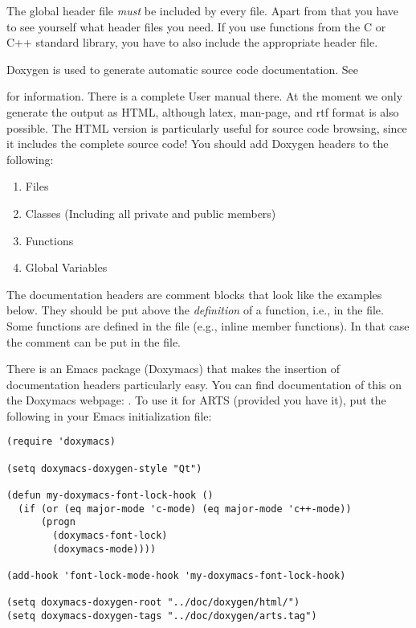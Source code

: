 The global header file  \emph{must} be included by every
file. Apart from that you have to see yourself what header files you
need. If you use functions from the C or C++ standard library, you
have to also include the appropriate header file.

Doxygen is used to generate automatic source code documentation. See
\begin{quote}
\end{quote}
for information. There is a complete User manual there. At the moment
we only generate the output as HTML, although latex, man-page, and rtf
format is also possible. The HTML version is particularly useful for
source code browsing, since it includes the complete source code! You
should add Doxygen headers to the following:

\begin{enumerate}
\item Files
\item Classes (Including all private and public members)
\item Functions
\item Global Variables
\end{enumerate}

The documentation headers are comment blocks that look like the
examples below. They should be put above the \emph{definition} of a
function, i.e., in the  file.  Some functions are defined in
the  file (e.g., inline member functions). In that case the
comment can be put in the  file.

There is an Emacs package (Doxymacs) that makes the insertion of
documentation headers particularly easy. You can find documentation of
this on the Doxymacs webpage: .
To use it for ARTS (provided you have it), put the following in your
Emacs initialization file:

\begin{verbatim}
(require 'doxymacs)

(setq doxymacs-doxygen-style "Qt")

(defun my-doxymacs-font-lock-hook ()
  (if (or (eq major-mode 'c-mode) (eq major-mode 'c++-mode))
      (progn
        (doxymacs-font-lock)
        (doxymacs-mode))))

(add-hook 'font-lock-mode-hook 'my-doxymacs-font-lock-hook)

(setq doxymacs-doxygen-root "../doc/doxygen/html/")
(setq doxymacs-doxygen-tags "../doc/doxygen/arts.tag")
\end{verbatim}


